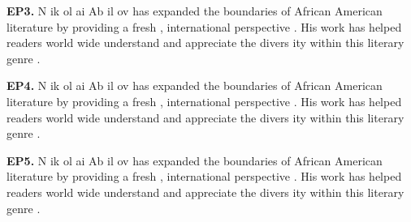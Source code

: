 \begin{mdframed}
\textbf{EP3.} \textcolor{Gray0}{N} \textcolor{Gray0}{ik} \textcolor{Gray0}{ol} \textcolor{Gray1}{ai} \textcolor{Gray0}{Ab} \textcolor{Gray0}{il} \textcolor{Gray0}{ov} \textcolor{Gray0}{has} \textcolor{Gray0}{expanded} \textcolor{Gray0}{the} \textcolor{Gray0}{boundaries} \textcolor{Gray0}{of} \textcolor{Gray0}{African} \textcolor{Gray0}{American} \textcolor{Gray0}{literature} \textcolor{Gray0}{by} \textcolor{Gray0}{providing} \textcolor{Gray0}{a} \textcolor{Gray0}{fresh} \textcolor{Gray0}{,} \textcolor{Gray0}{international} \textcolor{Gray0}{perspective} \textcolor{Gray0}{.} \textcolor{Gray0}{His} \textcolor{Gray0}{work} \textcolor{Gray0}{has} \textcolor{Gray0}{helped} \textcolor{Gray0}{readers} \textcolor{Gray0}{world} \textcolor{Gray1}{wide} \textcolor{Gray0}{understand} \textcolor{Gray0}{and} \textcolor{Gray0}{appreciate} \textcolor{Gray0}{the} \textcolor{Gray0}{divers} \textcolor{Gray4}{ity} \textcolor{Gray0}{within} \textcolor{Gray0}{this} \textcolor{Gray0}{literary} \textcolor{Gray0}{genre} \textcolor{Gray1}{.} 

\textbf{EP4.} \textcolor{Gray0}{N} \textcolor{Gray0}{ik} \textcolor{Gray0}{ol} \textcolor{Gray0}{ai} \textcolor{Gray0}{Ab} \textcolor{Gray0}{il} \textcolor{Gray0}{ov} \textcolor{Gray0}{has} \textcolor{Gray0}{expanded} \textcolor{Gray0}{the} \textcolor{Gray0}{boundaries} \textcolor{Gray0}{of} \textcolor{Gray0}{African} \textcolor{Gray0}{American} \textcolor{Gray0}{literature} \textcolor{Gray0}{by} \textcolor{Gray0}{providing} \textcolor{Gray0}{a} \textcolor{Gray0}{fresh} \textcolor{Gray0}{,} \textcolor{Gray0}{international} \textcolor{Gray0}{perspective} \textcolor{Gray0}{.} \textcolor{Gray0}{His} \textcolor{Gray0}{work} \textcolor{Gray0}{has} \textcolor{Gray0}{helped} \textcolor{Gray0}{readers} \textcolor{Gray0}{world} \textcolor{Gray0}{wide} \textcolor{Gray0}{understand} \textcolor{Gray0}{and} \textcolor{Gray0}{appreciate} \textcolor{Gray0}{the} \textcolor{Gray0}{divers} \textcolor{Gray0}{ity} \textcolor{Gray0}{within} \textcolor{Gray0}{this} \textcolor{Gray0}{literary} \textcolor{Gray0}{genre} \textcolor{Gray0}{.} 

\textbf{EP5.} \textcolor{Gray0}{N} \textcolor{Gray0}{ik} \textcolor{Gray0}{ol} \textcolor{Gray0}{ai} \textcolor{Gray0}{Ab} \textcolor{Gray0}{il} \textcolor{Gray0}{ov} \textcolor{Gray0}{has} \textcolor{Gray0}{expanded} \textcolor{Gray0}{the} \textcolor{Gray0}{boundaries} \textcolor{Gray0}{of} \textcolor{Gray0}{African} \textcolor{Gray0}{American} \textcolor{Gray0}{literature} \textcolor{Gray0}{by} \textcolor{Gray0}{providing} \textcolor{Gray0}{a} \textcolor{Gray0}{fresh} \textcolor{Gray0}{,} \textcolor{Gray0}{international} \textcolor{Gray0}{perspective} \textcolor{Gray0}{.} \textcolor{Gray0}{His} \textcolor{Gray0}{work} \textcolor{Gray0}{has} \textcolor{Gray0}{helped} \textcolor{Gray0}{readers} \textcolor{Gray0}{world} \textcolor{Gray0}{wide} \textcolor{Gray0}{understand} \textcolor{Gray0}{and} \textcolor{Gray0}{appreciate} \textcolor{Gray0}{the} \textcolor{Gray0}{divers} \textcolor{Gray0}{ity} \textcolor{Gray0}{within} \textcolor{Gray0}{this} \textcolor{Gray0}{literary} \textcolor{Gray0}{genre} \textcolor{Gray0}{.} 


\end{mdframed}

